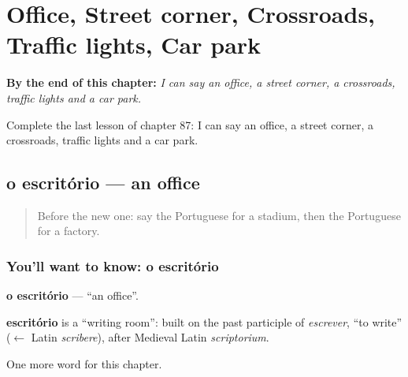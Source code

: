 
\chapter{Office, Street corner, Crossroads, Traffic lights, Car park}
\label{ch:pt-office-street-corner-crossroads-traffic-lights-car-park}

\begin{chapteropening}
\textbf{By the end of this chapter:} \emph{I can say an office, a street corner, a crossroads, traffic lights and a car park.}

Complete the last lesson of chapter 87: I can say an office, a street corner, a crossroads, traffic lights and a car park.
\end{chapteropening}

\section[o escritório]{o escritório — an office}

\label{lesson:PT-C87-escritorio}



\begin{quote}
Before the new one: say the Portuguese for a stadium, then the Portuguese for a factory.
\end{quote}

\subsection*{You'll want to know: o escritório}
\textbf{o escritório} — \textquotedblleft{}an office\textquotedblright{}.

\begin{cousinweb}
\textbf{escritório} is a \textquotedblleft{}writing room\textquotedblright{}: built on the past participle of \emph{escrever}, \textquotedblleft{}to write\textquotedblright{} ($\leftarrow$ Latin \emph{scribere}), after Medieval Latin \emph{scriptorium}.
\end{cousinweb}

\begin{grammarlens}[title={What you've built}]
One more word for this chapter.
\end{grammarlens}


